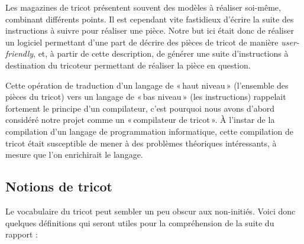 \documentclass{article}
\begin{document}
Les magazines de tricot présentent souvent des modèles à réaliser
soi-même, combinant différents points. Il est cependant vite
fastidieux d'écrire la suite des instructions à suivre pour réaliser
une pièce. Notre but ici était donc de réaliser un logiciel permettant
d'une part de décrire des pièces de tricot de manière
\emph{user-friendly}, et, à partir de cette description, de générer
une suite d'instructions à destination du tricoteur permettant de
réaliser la pièce en question.

Cette opération de traduction d'un langage de «\,haut niveau\,»
(l'ensemble des pièces du tricot) vers un langage de «\,bas niveau\,»
(les instructions) rappelait fortement le principe d'un compilateur,
c'est pourquoi nous avons d'abord considéré notre projet comme un
«\,compilateur de tricot\,». À l'instar de la compilation d'un langage
de programmation informatique, cette compilation de tricot était
susceptible de mener à des problèmes théoriques intéressants, à mesure
que l'on enrichirait le langage.

\subsection*{Notions de tricot} 

Le vocabulaire du tricot peut sembler un peu obscur aux non-initiés.
Voici donc quelques définitions qui seront utiles pour la compréhension
de la suite du rapport :
\end{document}
